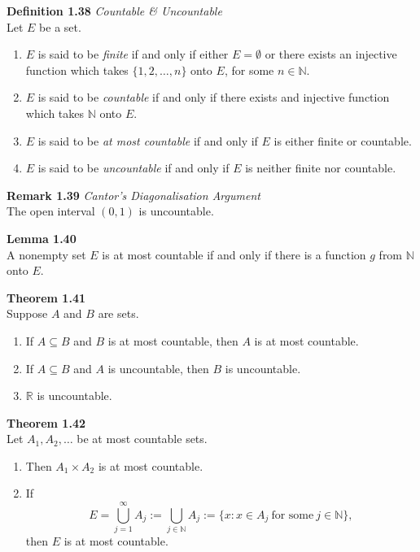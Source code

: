 \documentclass[8pt,landscape]{article}
\begin{document}
\begin{multicols}{3}
    \textbf{Definition 1.38} \emph{Countable \& Uncountable} \\
    Let $E$ be a set.
    \begin{enumerate}
        \item $E$ is said to be \emph{finite} if and only if either $E = \emptyset$
            or there exists an injective function which takes
            $\{ 1, 2, \ldots, n \}$ onto $E$, for some $n \in \mathbb{N}$.
        \item $E$ is said to be \emph{countable} if and only if there exists and injective
            function which takes $\mathbb{N}$ onto $E$.
        \item $E$ is said to be \emph{at most countable} if and only if $E$ is either
            finite or countable.
        \item $E$ is said to be \emph{uncountable} if and only if $E$ is neither finite nor
            countable.
    \end{enumerate}

    \textbf{Remark 1.39} \emph{Cantor's Diagonalisation Argument} \\
    The open interval $(0, 1)$ is uncountable.

    \textbf{Lemma 1.40} \\
    A nonempty set $E$ is at most countable if and only if there is a function $g$ from
    $\mathbb{N}$ onto $E$.

    \textbf{Theorem 1.41} \\
    Suppose $A$ and $B$ are sets.
    \begin{enumerate}
        \item If $A \subseteq B$ and $B$ is at most countable, then $A$ is at most
            countable.
        \item If $A \subseteq B$ and $A$ is uncountable, then $B$ is uncountable.
        \item $\mathbb{R}$ is uncountable.
    \end{enumerate}

    \textbf{Theorem 1.42} \\
    Let $A_1, A_2, \ldots$ be at most countable sets.
    \begin{enumerate}
        \item Then $A_1 \times A_2$ is at most countable.
        \item If
            \[
                E = \bigcup_{j=1}^\infty A_j :=
                \bigcup_{j \in \mathbb{N}} A_j :=
                \{ x : x \in A_j \ \text{for some} \ j \in \mathbb{N} \},
            \]
            then $E$ is at most countable.
    \end{enumerate}


\end{multicols}
\end{document}
